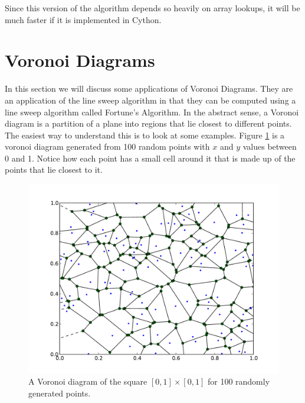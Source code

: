 Since this version of the algorithm depends so heavily on array lookups, it will be much faster if it is implemented in Cython.

\section*{Voronoi Diagrams}

In this section we will discuss some applications of Voronoi Diagrams.
They are an application of the line sweep algorithm in that they can be computed using a line sweep algorithm called Fortune's Algorithm.
In the abstract sense, a Voronoi diagram is a partition of a plane into regions that lie closest to different points.
The easiest way to understand this is to look at some examples.
Figure \ref{voronoi_ex_1} is a voronoi diagram generated from 100 random points with $x$ and $y$ values between 0 and 1.
Notice how each point has a small  cell around it that is made up of the points that lie closest to it.

\begin{figure}
\includegraphics[width=\textwidth]{voronoi_example_1.pdf}
\caption{A Voronoi diagram of the square $[0,1]\times [0,1]$ for 100 randomly generated points.}
\label{voronoi_ex_1}
\end{figure}

